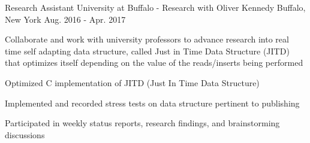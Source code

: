 \begin{cventries}
  \cventry
    {Research Assistant} %
    {University at Buffalo - Research with Oliver Kennedy} %
    {Buffalo, New York} %
    {Aug. 2016 - Apr. 2017} %
    {
      \begin{cvitems} %
        \item Collaborate and work with university professors to advance research into real time self adapting data structure, called Just in Time Data Structure (JITD) that optimizes itself depending on the value of the reads/inserts being performed
        \item {Optimized C implementation of JITD (Just In Time Data Structure)}
        \item {Implemented and recorded stress tests on data structure pertinent to publishing}
        \item Participated in weekly status reports, research findings, and brainstorming discussions
      \end{cvitems}
    }
\end{cventries}
